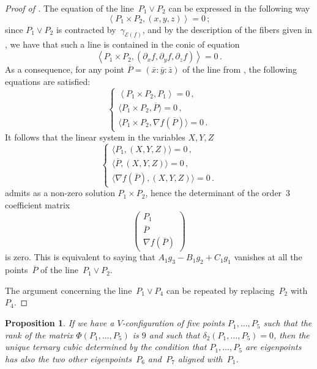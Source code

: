 \documentclass[a4paper, 11pt, reqno]{amsart}
\theoremstyle{plain}
\newtheorem{prop}[lemma]{Proposition}
\theoremstyle{definition}
\newcommand{\de}{\partial}
\newcommand{\Eig}[1]{\mathcal{E}\!\left( {#1} \right)}
\begin{document}
\begin{proof}[Proof of ]
The equation of the line~$P_1 \vee P_2$ can be expressed in the following way
%
\begin{equation}
\label{eq:lineP1P2}
  \left\langle P_1 \times P_2, (x,y,z) \right\rangle = 0 \,;
\end{equation}
%
since $P_1 \vee P_2$ is contracted by~$\gamma_{\Eig{f}}$,
and by the description of the fibers given in ,
we have that such a line is contained in the conic of equation
%
\[
  \left\langle P_1 \times P_2, (\de_x f, \de_y f, \de_z f) \right\rangle = 0 \,.
\]
%
As a consequence, for any point $\overline{P} = (\bar x: \bar y: \bar z)$ of the line from , the following equations are satisfied:
%
\[
  \left\{
  \begin{array}{l}
    \left\langle P_1 \times P_2, P_1 \right\rangle = 0 \,,\\[2pt]
    \bigl\langle P_1 \times P_2, \overline{P} \bigr\rangle = 0 \,,\\[2pt]
    \bigl\langle P_1 \times P_2, \nabla f (\overline{P}) \bigr\rangle = 0 \,.
  \end{array}
  \right.
\]
%
It follows that the linear system in the variables $X,Y,Z$
%
\[
  \left\{
  \begin{array}{l}
    \bigl\langle P_1, (X,Y,Z) \bigr\rangle = 0 \,,\\[2pt]
    \bigl\langle \overline{P}, (X,Y,Z) \bigr\rangle = 0 \,,\\[2pt]
    \bigl\langle \nabla f (\overline{P}),
    (X,Y,Z) \bigr\rangle = 0 \,.
  \end{array}
  \right.
\]
%
admits as a non-zero solution $P_1 \times P_2$,
hence the determinant of the order~$3$ coefficient matrix
%
\[
  \left(
  \begin{array}{c}
    P_1 \\
    \overline{P} \\
    \nabla f (\overline{P})
  \end{array}
  \right)
\]
%
is zero. This is equivalent to saying that $A_1 g_3 - B_1 g_2 + C_1 g_1$ vanishes at all the points~$\overline{P}$ of the line~$P_1 \vee P_2$.

The argument concerning the line~$P_1 \vee P_4$ can be repeated by replacing~$P_2$ with~$P_4$.
\end{proof}
%
\begin{prop}
\label{proposition:third_alignment}
If we have a $V$-configuration of five points $P_1, \dots, P_5$
such that the rank of the matrix $\Phi(P_1, \dots, P_5)$ is $9$ and
such that $\delta_2(P_1, \dots, P_5) = 0$,
then the unique ternary cubic determined by the condition that $P_1, \dots, P_5$
are eigenpoints has also the two other eigenpoints~$P_6$ and~$P_7$
aligned with~$P_1$.
\end{prop}
\end{document}
